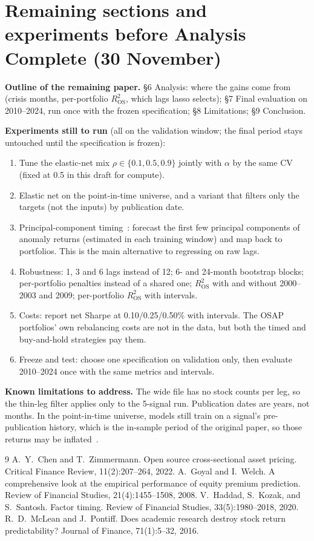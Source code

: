 \documentclass{article}
\newcommand{\ros}{R^2_{\mathrm{OS}}}
\begin{document}
\section{Remaining sections and experiments before Analysis Complete (30 November)}
\textbf{Outline of the remaining paper.} \S6 Analysis: where the gains come from (crisis months, per-portfolio $\ros$, which lags lasso selects); \S7 Final evaluation on 2010--2024, run once with the frozen specification; \S8 Limitations; \S9 Conclusion.

\textbf{Experiments still to run} (all on the validation window; the final period stays untouched until the specification is frozen):
\begin{enumerate}
\item Tune the elastic-net mix $\rho\in\{0.1,0.5,0.9\}$ jointly with $\alpha$ by the same CV (fixed at 0.5 in this draft for compute).
\item Elastic net on the point-in-time universe, and a variant that filters only the targets (not the inputs) by publication date.
\item Principal-component timing~\cite{hks2020}: forecast the first few principal components of anomaly returns (estimated in each training window) and map back to portfolios. This is the main alternative to regressing on raw lags.
\item Robustness: 1, 3 and 6 lags instead of 12; 6- and 24-month bootstrap blocks; per-portfolio penalties instead of a shared one; $\ros$ with and without 2000--2003 and 2009; per-portfolio $\ros$ with intervals.
\item Costs: report net Sharpe at 0.10/0.25/0.50\% with intervals. The OSAP portfolios' own rebalancing costs are not in the data, but both the timed and buy-and-hold strategies pay them.
\item Freeze and test: choose one specification on validation only, then evaluate 2010--2024 once with the same metrics and intervals.
\end{enumerate}

\textbf{Known limitations to address.} The wide file has no stock counts per leg, so the thin-leg filter applies only to the 5-signal run. Publication dates are years, not months. In the point-in-time universe, models still train on a signal's pre-publication history, which is the in-sample period of the original paper, so those returns may be inflated~\cite{mclean2016}.

\begin{thebibliography}{9}
\small
{} A.~Y.~Chen and T.~Zimmermann. Open source cross-sectional asset pricing. Critical Finance Review, 11(2):207--264, 2022.
 A.~Goyal and I.~Welch. A comprehensive look at the empirical performance of equity premium prediction. Review of Financial Studies, 21(4):1455--1508, 2008.
 V.~Haddad, S.~Kozak, and S.~Santosh. Factor timing. Review of Financial Studies, 33(5):1980--2018, 2020.
 R.~D.~McLean and J.~Pontiff. Does academic research destroy stock return predictability? Journal of Finance, 71(1):5--32, 2016.
\end{thebibliography}
\end{document}
